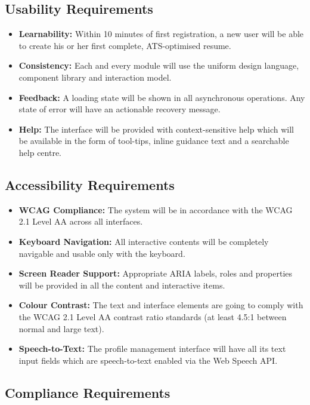 \documentclass[12pt, a4paper, oneside]{report}
\begin{document}
\subsection{Usability Requirements}

\begin{itemize}
    \item \textbf{Learnability:} Within 10 minutes of first registration, a new user will be able to create his or her first complete, ATS-optimised resume.
    \item \textbf{Consistency:} Each and every module will use the uniform design language, component library and interaction model.
    \item \textbf{Feedback:} A loading state will be shown in all asynchronous operations. Any state of error will have an actionable recovery message.
    \item \textbf{Help:} The interface will be provided with context-sensitive help which will be available in the form of tool-tips, inline guidance text and a searchable help centre.
\end{itemize}

\subsection{Accessibility Requirements}

\begin{itemize}
    \item \textbf{WCAG Compliance:} The system will be in accordance with the WCAG 2.1 Level AA \cite{wcag21} across all interfaces.
    \item \textbf{Keyboard Navigation:} All interactive contents will be completely navigable and usable only with the keyboard.
    \item \textbf{Screen Reader Support:} Appropriate ARIA labels, roles and properties will be provided in all the content and interactive items\cite{waiaria2023}.
    \item \textbf{Colour Contrast:} The text and interface elements are going to comply with the WCAG 2.1 Level AA contrast ratio standards (at least 4.5:1 between normal and large text).
    \item \textbf{Speech-to-Text:} The profile management interface will have all its text input fields which are speech-to-text enabled \cite{sears2003} via the Web Speech API.
\end{itemize}

\subsection{Compliance Requirements}
\end{document}
